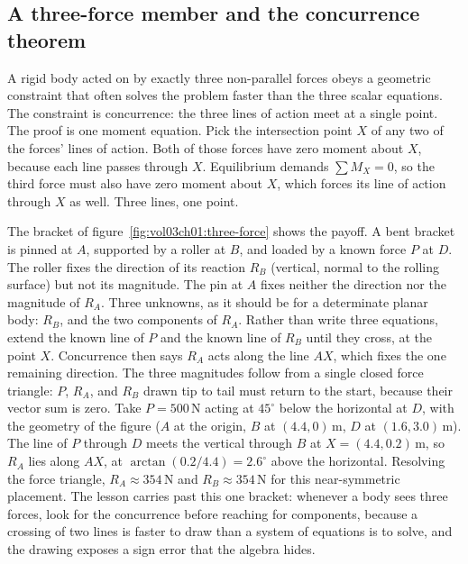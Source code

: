 \subsection{A three-force member and the concurrence theorem}



A rigid body acted on by exactly three non-parallel forces obeys a
geometric constraint that often solves the problem faster than the three
scalar equations. The constraint is concurrence: the three lines of
action meet at a single point. The proof is one moment equation. Pick the
intersection point $X$ of any two of the forces' lines of action. Both of
those forces have zero moment about $X$, because each line passes through
$X$. Equilibrium demands $\sum M_X = 0$, so the third force must also have
zero moment about $X$, which forces its line of action through $X$ as
well. Three lines, one point.

The bracket of figure~\ref{fig:vol03ch01:three-force} shows the payoff. A
bent bracket is pinned at $A$, supported by a roller at $B$, and loaded by
a known force $P$ at $D$. The roller fixes the direction of its reaction
$R_B$ (vertical, normal to the rolling surface) but not its magnitude. The
pin at $A$ fixes neither the direction nor the magnitude of $R_A$. Three
unknowns, as it should be for a determinate planar body: $R_B$, and the
two components of $R_A$. Rather than write three equations, extend the
known line of $P$ and the known line of $R_B$ until they cross, at the
point $X$. Concurrence then says $R_A$ acts along the line $AX$, which
fixes the one remaining direction. The three magnitudes follow from a
single closed force triangle: $P$, $R_A$, and $R_B$ drawn tip to tail
must return to the start, because their vector sum is zero. Take $P =
500\,\text{N}$ acting at $45^{\circ}$ below the horizontal at $D$, with
the geometry of the figure ($A$ at the origin, $B$ at $(4.4, 0)\,\si{
\meter}$, $D$ at $(1.6, 3.0)\,\si{\meter}$). The line of $P$ through $D$
meets the vertical through $B$ at $X = (4.4, 0.2)\,\si{\meter}$, so $R_A$
lies along $AX$, at $\arctan(0.2/4.4) = 2.6^{\circ}$ above the horizontal.
Resolving the force triangle, $R_A \approx 354\,\text{N}$ and $R_B \approx
354\,\text{N}$ for this near-symmetric placement. The lesson carries past
this one bracket: whenever a body sees three forces, look for the
concurrence before reaching for components, because a crossing of two
lines is faster to draw than a system of equations is to solve, and the
drawing exposes a sign error that the algebra hides.

